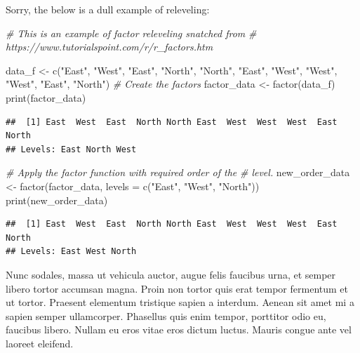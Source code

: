 \documentclass[
]{article}
\newenvironment{Shaded}{\begin{snugshade}}{\end{snugshade}}
\newcommand{\AttributeTok}[1]{\textcolor[rgb]{0.77,0.63,0.00}{#1}}
\newcommand{\CommentTok}[1]{\textcolor[rgb]{0.56,0.35,0.01}{\textit{#1}}}
\newcommand{\FunctionTok}[1]{\textcolor[rgb]{0.00,0.00,0.00}{#1}}
\newcommand{\NormalTok}[1]{#1}
\newcommand{\OtherTok}[1]{\textcolor[rgb]{0.56,0.35,0.01}{#1}}
\newcommand{\StringTok}[1]{\textcolor[rgb]{0.31,0.60,0.02}{#1}}
\begin{document}
Sorry, the below is a dull example of releveling:

\begin{Shaded}
\begin{Highlighting}[]
\CommentTok{\# This is an example of factor releveling snatched from}
\CommentTok{\# https://www.tutorialspoint.com/r/r\_factors.htm}

\NormalTok{data\_f }\OtherTok{\textless{}{-}} \FunctionTok{c}\NormalTok{(}\StringTok{"East"}\NormalTok{, }\StringTok{"West"}\NormalTok{, }\StringTok{"East"}\NormalTok{, }\StringTok{"North"}\NormalTok{, }\StringTok{"North"}\NormalTok{, }\StringTok{"East"}\NormalTok{,}
    \StringTok{"West"}\NormalTok{, }\StringTok{"West"}\NormalTok{, }\StringTok{"West"}\NormalTok{, }\StringTok{"East"}\NormalTok{, }\StringTok{"North"}\NormalTok{)}
\CommentTok{\# Create the factors}
\NormalTok{factor\_data }\OtherTok{\textless{}{-}} \FunctionTok{factor}\NormalTok{(data\_f)}
\FunctionTok{print}\NormalTok{(factor\_data)}
\end{Highlighting}
\end{Shaded}

\begin{verbatim}
##  [1] East  West  East  North North East  West  West  West  East  North
## Levels: East North West
\end{verbatim}

\begin{Shaded}
\begin{Highlighting}[]
\CommentTok{\# Apply the factor function with required order of the}
\CommentTok{\# level.}
\NormalTok{new\_order\_data }\OtherTok{\textless{}{-}} \FunctionTok{factor}\NormalTok{(factor\_data, }\AttributeTok{levels =} \FunctionTok{c}\NormalTok{(}\StringTok{"East"}\NormalTok{, }\StringTok{"West"}\NormalTok{,}
    \StringTok{"North"}\NormalTok{))}
\FunctionTok{print}\NormalTok{(new\_order\_data)}
\end{Highlighting}
\end{Shaded}

\begin{verbatim}
##  [1] East  West  East  North North East  West  West  West  East  North
## Levels: East West North
\end{verbatim}

Nunc sodales, massa ut vehicula auctor, augue felis faucibus urna, et
semper libero tortor accumsan magna. Proin non tortor quis erat tempor
fermentum et ut tortor. Praesent elementum tristique sapien a interdum.
Aenean sit amet mi a sapien semper ullamcorper. Phasellus quis enim
tempor, porttitor odio eu, faucibus libero. Nullam eu eros vitae eros
dictum luctus. Mauris congue ante vel laoreet eleifend.
\end{document}
